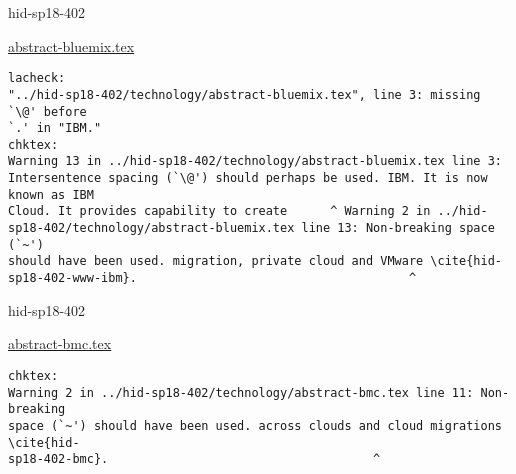 \begin{IU}

hid-sp18-402

\href{https://github.com/cloudmesh-community/hid-sp18-402/blob/master//technology/abstract-bluemix.tex}{abstract-bluemix.tex}

\begin{tiny}
\begin{verbatim}
lacheck:
"../hid-sp18-402/technology/abstract-bluemix.tex", line 3: missing `\@' before
`.' in "IBM."
chktex:
Warning 13 in ../hid-sp18-402/technology/abstract-bluemix.tex line 3:
Intersentence spacing (`\@') should perhaps be used. IBM. It is now known as IBM
Cloud. It provides capability to create      ^ Warning 2 in ../hid-
sp18-402/technology/abstract-bluemix.tex line 13: Non-breaking space (`~')
should have been used. migration, private cloud and VMware \cite{hid-
sp18-402-www-ibm}.                                      ^
\end{verbatim}
\end{tiny}
\end{IU}



\begin{IU}

hid-sp18-402

\href{https://github.com/cloudmesh-community/hid-sp18-402/blob/master//technology/abstract-bmc.tex}{abstract-bmc.tex}

\begin{tiny}
\begin{verbatim}
chktex:
Warning 2 in ../hid-sp18-402/technology/abstract-bmc.tex line 11: Non-breaking
space (`~') should have been used. across clouds and cloud migrations \cite{hid-
sp18-402-bmc}.                                     ^
\end{verbatim}
\end{tiny}
\end{IU}



